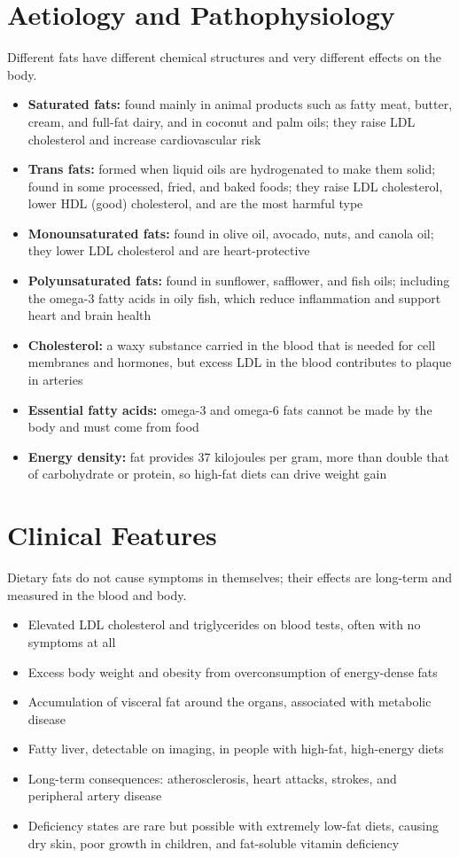 \section*{Aetiology and Pathophysiology}
Different fats have different chemical structures and very different effects on the body.
\begin{itemize}
    \item \textbf{Saturated fats:} found mainly in animal products such as fatty meat, butter, cream, and full-fat dairy, and in coconut and palm oils; they raise LDL cholesterol and increase cardiovascular risk
    \item \textbf{Trans fats:} formed when liquid oils are hydrogenated to make them solid; found in some processed, fried, and baked foods; they raise LDL cholesterol, lower HDL (good) cholesterol, and are the most harmful type
    \item \textbf{Monounsaturated fats:} found in olive oil, avocado, nuts, and canola oil; they lower LDL cholesterol and are heart-protective
    \item \textbf{Polyunsaturated fats:} found in sunflower, safflower, and fish oils; including the omega-3 fatty acids in oily fish, which reduce inflammation and support heart and brain health
    \item \textbf{Cholesterol:} a waxy substance carried in the blood that is needed for cell membranes and hormones, but excess LDL in the blood contributes to plaque in arteries
    \item \textbf{Essential fatty acids:} omega-3 and omega-6 fats cannot be made by the body and must come from food
    \item \textbf{Energy density:} fat provides 37 kilojoules per gram, more than double that of carbohydrate or protein, so high-fat diets can drive weight gain
\end{itemize}

\section*{Clinical Features}
Dietary fats do not cause symptoms in themselves; their effects are long-term and measured in the blood and body.
\begin{itemize}
    \item Elevated LDL cholesterol and triglycerides on blood tests, often with no symptoms at all
    \item Excess body weight and obesity from overconsumption of energy-dense fats
    \item Accumulation of visceral fat around the organs, associated with metabolic disease
    \item Fatty liver, detectable on imaging, in people with high-fat, high-energy diets
    \item Long-term consequences: atherosclerosis, heart attacks, strokes, and peripheral artery disease
    \item Deficiency states are rare but possible with extremely low-fat diets, causing dry skin, poor growth in children, and fat-soluble vitamin deficiency
\end{itemize}

